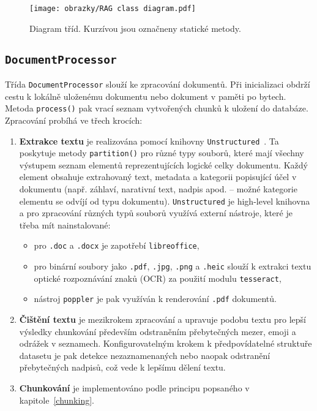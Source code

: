 \begin{figure}[H]
    \centering
    \texttt{[image: obrazky/RAG class diagram.pdf]}
    \caption{Diagram tříd. Kurzívou jsou označneny statické metody.}
    \label{fig:class}
\end{figure}

\subsection{\texttt{DocumentProcessor}}
Třída \texttt{DocumentProcessor} slouží ke zpracování dokumentů. Při inicializaci obdrží cestu k lokálně uloženému dokumentu nebo dokument v paměti po bytech. Metoda \texttt{process()} pak vrací seznam vytvořených chunků k uložení do databáze. Zpracování probíhá ve třech krocích:
\begin{enumerate}
    \item \textbf{Extrakce textu} je realizována pomocí knihovny \texttt{Unstructured}~\cite{unstructured}. Ta poskytuje metody \texttt{partition()} pro různé typy souborů, které mají všechny výstupem seznam elementů reprezentujících logické celky dokumentu. Každý element obsahuje extrahovaný text, metadata a kategorii popisující účel v dokumentu (např. záhlaví, narativní text, nadpis apod. – možné kategorie elementu se odvíjí od typu dokumentu). \texttt{Unstructured} je high-level knihovna a pro zpracování různých typů souborů využívá externí nástroje, které je třeba mít nainstalované:
    \begin{itemize}
        \item pro \texttt{.doc} a \texttt{.docx} je zapotřebí \texttt{libreoffice},
        \item pro binární soubory jako \texttt{.pdf}, \texttt{.jpg}, \texttt{.png} a \texttt{.heic} slouží k extrakci textu optické rozpoznávání znaků (OCR) za použití modulu \texttt{tesseract},
        \item nástroj \texttt{poppler} je pak využíván k renderování \texttt{.pdf} dokumentů.
    \end{itemize}
    \item \textbf{Čištění textu} je mezikrokem zpracování a upravuje podobu textu pro lepší výsledky chunkování především odstraněním přebytečných mezer, emoji a odrážek v seznamech. Konfigurovatelným krokem k předpovídatelné struktuře datasetu je pak detekce nezaznamenaných nebo naopak odstranění přebytečných nadpisů, což vede k lepšímu dělení textu.
    \item \textbf{Chunkování} je implementováno podle principu popsaného v kapitole~\ref{chunking}. 
    

\end{enumerate}
